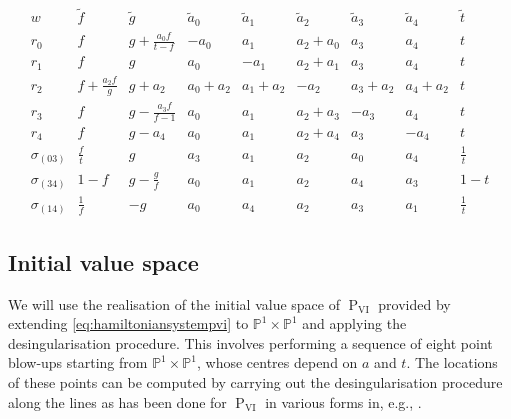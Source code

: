 \documentclass[a4paper,reqno]{amsart}
\numberwithin{equation}{section}
\newcommand{\p}{\mathbb{P}}
\newcommand{\pain}[1]{\operatorname{P}_{\mathrm{#1}}}
\numberwithin{equation}{section}
\begin{document}
\begingroup

\setlength{\tabcolsep}{15pt} %
\renewcommand{\arraystretch}{1.5} %

\begin{table}[htb]
    \begin{equation*}
    \begin{array}{c||c|c||c|c|c|c|c||c|}
        w       & \tilde{f}     & \tilde{g}     & \tilde{a}_0   & \tilde{a}_1   & \tilde{a}_2   & \tilde{a}_3   &  \tilde{a}_4      & \tilde{t}     \\
        \hline\hline 
        r_0    & f     & g + \frac{a_0 f}{t-f}    & -a_0   & a_1   & a_2 + a_0   & a_3   &  a_4      & t  \\
        r_1    & f     & g     & a_0   & - a_1   & a_2 + a_1   & {a}_3   &  {a}_4      & t  \\
        r_2    & f+ \frac{a_2 f}{g}    & g+a_2     & a_0+a_2   & a_1 +a_2   & -{a}_2   & {a}_3 +a_2  &  {a}_4+a_2      & {t}  \\
        r_3    & {f}     & {g} - \frac{a_3 f}{f-1}     & {a}_0   & {a}_1   & {a}_2+a_3   & -{a}_3   &  {a}_4      & {t}  \\
        r_4    & {f}     & {g} -a_4    & {a}_0   & {a}_1   & {a}_2+a_4   & {a}_3   &  -{a}_4      & {t}   \\
        \hline \hline
        \sigma_{(03)}   & \frac{f}{t}     & {g}     & {a}_3   & {a}_1   & {a}_2   & {a}_0   &  {a}_4      & \frac{1}{t}     \\
        \sigma_{(34)}   & 1 - f     & g - \frac{g}{f}     & {a}_0   & {a}_1   & {a}_2   & {a}_4   &  {a}_3      & 1-t     \\
        \sigma_{(14)}   & \frac{1}{f}     & -g     & {a}_0   & {a}_4   & {a}_2   & {a}_3   &  {a}_1      & \frac{1}{t}     
    \end{array}
    \end{equation*}
    \caption{Symmetries of $\pain{VI}$ on $(f,g)$ variables and root variable parameters $a$.}
    \label{tab:PVI:symmetry:varsandparams}
\end{table}
\endgroup

\subsection{Initial value space}

We will use the realisation of the initial value space of $\pain{VI}$ provided by extending \eqref{eq:hamiltoniansystempvi} to $\p^1 \times \p^1$ and applying the desingularisation procedure.
This involves performing a sequence of eight point blow-ups starting from $\p^1 \times\p^1$, whose centres depend on $a$ and $t$. 
The locations of these points can be computed by carrying out the desingularisation procedure along the lines as has been done for $\pain{VI}$ in various forms in, e.g., \cites{okamoto1979,heujoshiradnovic,differenthamsdzhamay}.
\end{document}
